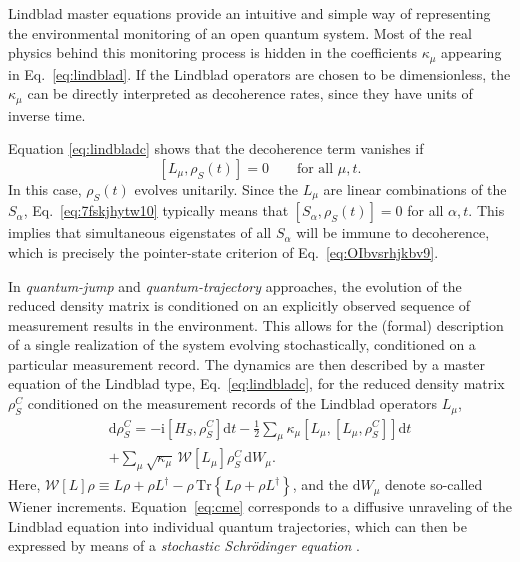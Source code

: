 \documentclass[aps,pra,reprint,amsmath,amssymb,showpacs,nofootinbib,floatfix,onecolumn,12pt]{revtex4-1}
\newcommand{\D}{\text{d}}
\newcommand{\I}{\text{i}}
\begin{document}
Lindblad master equations provide an intuitive and simple way of representing the environmental monitoring of an open quantum system. Most of the real physics behind this monitoring process is hidden in the coefficients $\kappa_\mu$ appearing in Eq.~\eqref{eq:lindblad}. If the Lindblad operators are chosen to be dimensionless, the $\kappa_\mu$ can be directly interpreted as decoherence rates, since they have units of inverse time. 

Equation \eqref{eq:lindbladc} shows that the decoherence term vanishes if 
%
\begin{equation}
  \label{eq:7fskjhytw10}
  \left[ L_\mu, \rho_S(t) \right] = 0 \qquad \text{for all $\mu,t$}.
\end{equation}
%
In this case, $\rho_S(t)$ evolves unitarily. Since the $L_\mu$ are linear combinations of the $S_\alpha$, Eq.~\eqref{eq:7fskjhytw10} typically means that
$\left[ S_\alpha, \rho_S(t) \right] = 0$ for all $\alpha, t$. This implies that simultaneous eigenstates of all $S_\alpha$ will be immune to decoherence, which is precisely the pointer-state criterion of Eq.~\eqref{eq:OIbvsrhjkbv9}.

In \emph{quantum-jump} and \emph{quantum-trajectory} approaches, the evolution of the reduced density matrix is conditioned on an explicitly observed sequence of measurement results in the environment. This allows for the (formal) description of a single realization of the system evolving stochastically, conditioned on a particular measurement record. The dynamics are then described by a master equation of the Lindblad type, Eq.~\eqref{eq:lindbladc}, for the reduced density matrix $\rho^C_S$ conditioned on the measurement records of the Lindblad operators $L_\mu$,
%
\begin{multline} \label{eq:cme}
\D \rho^C_S = -\I \left[H_S, \rho_S^C \right] \D t  - \frac{1}{2} \sum_\mu \kappa_\mu \left[L_\mu, \left[L_\mu, \rho_S^C\right] \right] \D t \\+ \sum_\mu \sqrt{\kappa_\mu} \, \mathcal{W}[L_\mu] \rho_S^C \, \D W_\mu.  
\end{multline}
%
Here, $\mathcal{W}[L]\rho \equiv L \rho + \rho L^\dagger - \rho \, \text{Tr} \left\{ L\rho + \rho L^\dagger \right\}$, and the $\D W_\mu$ denote so-called Wiener increments. Equation~\eqref{eq:cme} corresponds to a diffusive unraveling of the Lindblad equation into individual quantum trajectories, which can then be expressed by means of a \emph{stochastic Schr\"odinger equation} \cite{Barchielli:1991:fv,Belavkin:1989:an,Belavkin:1989:am,Belavkin:1989:um,Belavkin:1995:tt,Diosi:1988:wx,Diosi:1988:hn,Diosi:1988:bv,Gisin:1984:qs,Gisin:1989:jn,Wiseman:1994:qq,Goan:2001:rz,Plenio:1998:bb}.
\end{document}
